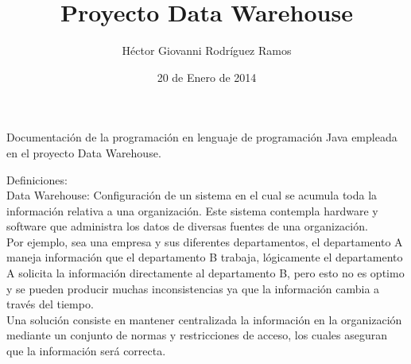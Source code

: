 \documentclass[12pt, letterpaper]{article}
\begin{document}
\title{Proyecto Data Warehouse}
\author{Héctor Giovanni Rodríguez Ramos}
\date{20 de Enero de 2014}
\maketitle
\begin{center}
Documentación de la programación en lenguaje de programación Java empleada en el proyecto Data Warehouse.
\end{center}

\newpage
Definiciones:\\
Data Warehouse: Configuración de un sistema en el cual se acumula toda la información relativa a una organización. Este sistema contempla hardware y software que administra los datos de diversas fuentes de una organización.\\
Por ejemplo, sea una empresa y sus diferentes departamentos, el departamento A maneja información que el departamento B trabaja, lógicamente el departamento A solicita la información directamente al departamento B, pero esto no es optimo y se pueden producir muchas inconsistencias ya que la información cambia a través del tiempo.\\
Una solución consiste en mantener centralizada la información en la organización mediante un conjunto de normas y restricciones de acceso, los cuales aseguran que la información será correcta.\\
\end{document}
